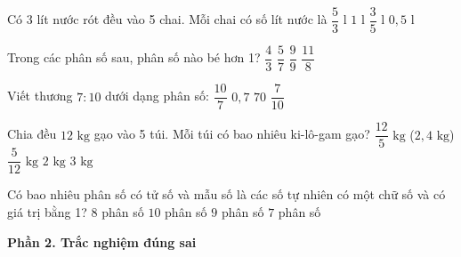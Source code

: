 \begin{ex} %
Có 3 lít nước rót đều vào 5 chai. Mỗi chai có số lít nước là
\choice
{$\dfrac{5}{3}\text{ l}$}
{$1\text{ l}$}
{\True $\dfrac{3}{5}\text{ l}$}
{$0{,}5\text{ l}$}
\end{ex}

\begin{ex} %
Trong các phân số sau, phân số nào bé hơn 1?
\choice
{$\dfrac{4}{3}$}
{\True $\dfrac{5}{7}$}
{$\dfrac{9}{9}$}
{$\dfrac{11}{8}$}
\end{ex}

\begin{ex} %
Viết thương $7 : 10$ dưới dạng phân số:
\choice
{$\dfrac{10}{7}$}
{$0{,}7$}
{$70$}
{\True $\dfrac{7}{10}$}
\end{ex}

\begin{ex} %
Chia đều $12\text{ kg}$ gạo vào 5 túi. Mỗi túi có bao nhiêu ki-lô-gam gạo?
\choice
{\True $\dfrac{12}{5}\text{ kg}$ ($2{,}4\text{ kg}$)}
{$\dfrac{5}{12}\text{ kg}$}
{$2\text{ kg}$}
{$3\text{ kg}$}
\end{ex}

\begin{ex} %
Có bao nhiêu phân số có tử số và mẫu số là các số tự nhiên có một chữ số và có giá trị bằng 1?
\choice
{$8$ phân số}
{$10$ phân số}
{\True $9$ phân số}
{$7$ phân số}
\end{ex}

\textbf{Phần 2. Trắc nghiệm đúng sai}

